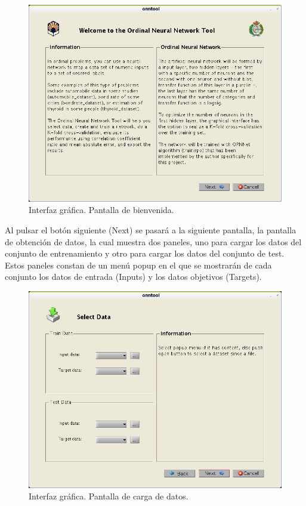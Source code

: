 		\begin{figure}[htbp]
			\centering
			\includegraphics[scale=0.5]{interfaz/interface01.png}
			\caption{Interfaz gráfica. Pantalla de bienvenida.}
			\label{fig:int01}
		\end{figure}
		
		Al pulsar el botón siguiente (Next) se pasará a la siguiente pantalla, la pantalla de obtención de datos, la cual muestra dos paneles, uno para cargar los datos del conjunto de entrenamiento y otro para cargar los datos del conjunto de test. Estos paneles constan de un menú popup en el que se mostrarán de cada conjunto los datos de entrada (Inputs) y los datos objetivos (Targets).\\
		
		\begin{figure}[htbp]
			\centering
			\includegraphics[scale=0.5]{interfaz/interface02.png}
			\caption{Interfaz gráfica. Pantalla de carga de datos.}
			\label{fig:int02}
		\end{figure}
		

